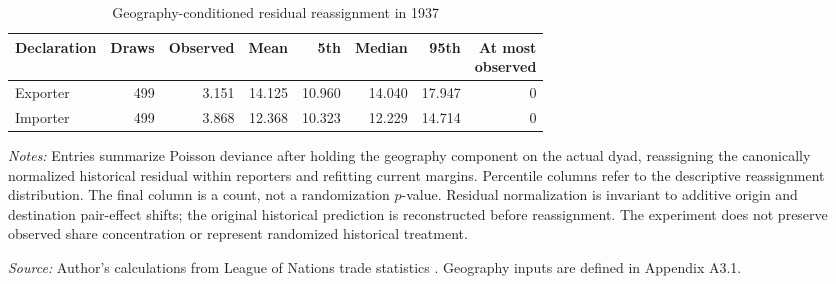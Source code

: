 \begin{table}[!htbp]\centering
\caption{Geography-conditioned residual reassignment in 1937}\label{tab:app_reassignment}
\begin{threeparttable}\footnotesize\setlength{\tabcolsep}{4pt}
\begin{tabular}{@{}lrrrrrrr@{}}
\toprule
Declaration & Draws & Observed & Mean & 5th & Median & 95th & \shortstack{At most\\observed} \\
\midrule
Exporter & 499 & 3.151 & 14.125 & 10.960 & 14.040 & 17.947 & 0 \\
Importer & 499 & 3.868 & 12.368 & 10.323 & 12.229 & 14.714 & 0 \\
\bottomrule
\end{tabular}
\begin{tablenotes}[flushleft]\footnotesize\item \textit{Notes:} Entries summarize Poisson deviance after holding the geography component on the actual dyad, reassigning the canonically normalized historical residual within reporters and refitting current margins. Percentile columns refer to the descriptive reassignment distribution. The final column is a count, not a randomization $p$-value. Residual normalization is invariant to additive origin and destination pair-effect shifts; the original historical prediction is reconstructed before reassignment. The experiment does not preserve observed share concentration or represent randomized historical treatment.
\item \textit{Source:} Author's calculations from League of Nations trade statistics \parencite{league1930,league1936,league1938}. Geography inputs are defined in Appendix A3.1.
\end{tablenotes}\end{threeparttable}\end{table}
